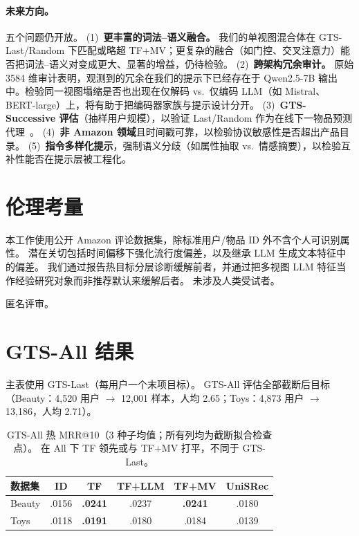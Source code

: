 \documentclass[sigconf,natbib=true,anonymous]{acmart}
\newcommand{\tfmv}{\textsc{TF+MV}\xspace}
\begin{document}
\paragraph{未来方向。}
五个问题仍开放。
(1)~\textbf{更丰富的词法--语义融合。} 我们的单视图混合体在 GTS-Last/Random 下匹配或略超 \tfmv；更复杂的融合（如门控、交叉注意力）能否把词法--语义对变成更大、显著的增益，仍待检验。
(2)~\textbf{跨架构冗余审计。} 原始 3584 维审计表明，观测到的冗余在我们的提示下已经存在于 Qwen2.5-7B 输出中。检验同一视图塌缩是否也出现在仅解码 vs.\ 仅编码 LLM（如 Mistral、BERT-large）上，将有助于把编码器家族与提示设计分开。
(3)~\textbf{GTS-Successive 评估}（抽样用户规模），以验证 Last/Random 作为在线下一物品预测代理~\cite{gusak2025time}。
(4)~\textbf{非 Amazon 领域}且时间戳可靠，以检验协议敏感性是否超出产品目录。
(5)~\textbf{指令多样化提示}，强制语义分歧（如属性抽取 vs.\ 情感摘要），以检验互补性能否在提示层被工程化。

\section*{伦理考量}
本工作使用公开 Amazon 评论数据集，除标准用户/物品 ID 外不含个人可识别属性。
潜在关切包括时间偏移下强化流行度偏差，以及继承 LLM 生成文本特征中的偏差。
我们通过报告热目标分层诊断缓解前者，并通过把多视图 LLM 特征当作经验研究对象而非推荐默认来缓解后者。
未涉及人类受试者。

\begin{acks}
匿名评审。
\end{acks}

\appendix

\section{GTS-All 结果}
\label{app:gts-all}

主表使用 GTS-Last（每用户一个末项目标）。
GTS-All 评估全部截断后目标（Beauty：4{,}520 用户 $\to$ 12{,}001 样本，人均 2.65；Toys：4{,}873 用户 $\to$ 13{,}186，人均 2.71）。

\begin{table}[h]
\centering
\caption{GTS-All 热 MRR@10（3 种子均值；所有列均为截断拟合检查点）。
在 All 下 TF 领先或与 \tfmv 打平，不同于 GTS-Last。}
\label{tab:gts-all}
\small
\begin{tabular}{@{}lccccc@{}}
\toprule
数据集 & ID & TF & TF+LLM & TF+MV & UniSRec \\
\midrule
Beauty & .0156 & \textbf{.0241} & .0237 & \textbf{.0241} & .0180 \\
Toys   & .0118 & \textbf{.0191} & .0180 & .0184 & .0139 \\
\bottomrule
\end{tabular}
\end{table}
\end{document}
